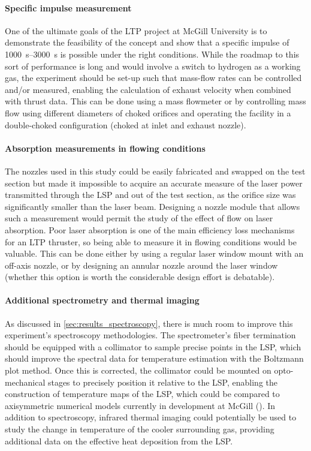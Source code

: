        \paragraph{Specific impulse measurement} One of the ultimate goals of the LTP project at McGill University is to demonstrate the feasibility of the concept and show that a specific impulse of \qtyrange{1000}{3000}{s} is possible under the right conditions. While the roadmap to this sort of performance is long and would involve a switch to hydrogen as a working gas, the experiment should be set-up such that mass-flow rates can be controlled and/or measured, enabling the calculation of exhaust velocity when combined with thrust data. This can be done using a mass flowmeter or by controlling mass flow using different diameters of choked orifices and operating the facility in a double-choked configuration (choked at inlet and exhaust nozzle).

        \paragraph{Absorption measurements in flowing conditions} The nozzles used in this study could be easily fabricated and swapped on the test section but made it impossible to acquire an accurate measure of the laser power transmitted through the LSP and out of the test section, as the orifice size was significantly smaller than the laser beam. Designing a nozzle module that allows such a measurement would permit the study of the effect of flow on laser absorption. Poor laser absorption is one of the main efficiency loss mechanisms for an LTP thruster, so being able to measure it in flowing conditions would be valuable. This can be done either by using a regular laser window mount with an off-axis nozzle, or by designing an annular nozzle around the laser window (whether this option is worth the considerable design effort is debatable).

        \paragraph{Additional spectrometry and thermal imaging} As discussed in \autoref{sec:results_spectroscopy}, there is much room to improve this experiment's spectroscopy methodologies. The spectrometer's fiber termination should be equipped with a collimator to sample precise points in the LSP, which should improve the spectral data for temperature estimation with the Boltzmann plot method. Once this is corrected, the collimator could be mounted on opto-mechanical stages to precisely position it relative to the LSP, enabling the construction of temperature maps of the LSP, which could be compared to axisymmetric numerical models currently in development at McGill (\textcite{baoTwoDimensionalSimulationLasera}). In addition to spectroscopy, infrared thermal imaging could potentially be used to study the change in temperature of the cooler surrounding gas, providing additional data on the effective heat deposition from the LSP.